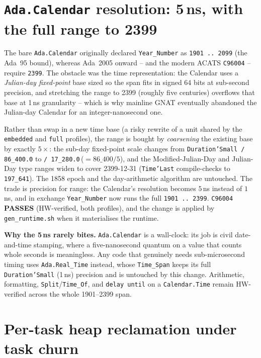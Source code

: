 \section{\texttt{Ada.Calendar} resolution: 5\,ns, with the full range to 2399}

The bare \texttt{Ada.Calendar} originally declared \texttt{Year\_Number} as
\texttt{1901\,..\,2099} (the Ada~95 bound), whereas Ada~2005 onward -- and the
modern ACATS \texttt{C96004} -- require \texttt{2399}. The obstacle was the time
representation: the Calendar uses a \emph{Julian-day fixed-point} base sized so the
span fits in signed 64 bits at sub-second precision, and stretching the range to
2399 (roughly five centuries) overflows that base at 1\,ns granularity -- which is
why mainline GNAT eventually abandoned the Julian-day Calendar for an
integer-nanosecond one.

Rather than swap in a new time base (a risky rewrite of a unit shared by the
\texttt{embedded} and \texttt{full} profiles), the range is bought by
\emph{coarsening} the existing base by exactly $5\times$: the sub-day fixed-point
scale changes from \texttt{Duration'Small\,/\,86\_400.0} to
\texttt{/\,17\_280.0}\,($=86\_400/5$), and the Modified-Julian-Day and Julian-Day
type ranges widen to cover 2399-12-31 (\texttt{Time'Last} compile-checks to
\texttt{197\_641}). The 1858 epoch and the day-arithmetic algorithm are untouched.
The trade is precision for range: the Calendar's resolution becomes $5$\,ns instead
of $1$\,ns, and in exchange \texttt{Year\_Number} now runs the full
\texttt{1901\,..\,2399}. \texttt{C96004} \textbf{PASSES} (HW-verified, both
profiles), and the change is applied by \texttt{gen\_runtime.sh} when it
materialises the runtime.

\textbf{Why the 5\,ns rarely bites.} \texttt{Ada.Calendar} is a wall-clock: its job
is civil date-and-time stamping, where a five-nanosecond quantum on a value that
counts whole seconds is meaningless. Any code that genuinely needs sub-microsecond
timing uses \texttt{Ada.Real\_Time} instead, whose \texttt{Time\_Span} keeps its
full \texttt{Duration'Small} (1\,ns) precision and is untouched by this change.
Arithmetic, formatting, \texttt{Split}/\texttt{Time\_Of}, and \texttt{delay until}
on a \texttt{Calendar.Time} remain HW-verified across the whole 1901--2399 span.

\section{Per-task heap reclamation under task churn}

